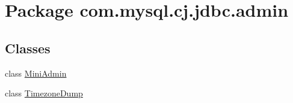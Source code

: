 \hypertarget{namespacecom_1_1mysql_1_1cj_1_1jdbc_1_1admin}{}\section{Package com.\+mysql.\+cj.\+jdbc.\+admin}
\label{namespacecom_1_1mysql_1_1cj_1_1jdbc_1_1admin}
\subsection*{Classes}
\begin{DoxyCompactItemize}
\item 
class \mbox{\hyperlink{classcom_1_1mysql_1_1cj_1_1jdbc_1_1admin_1_1_mini_admin}{Mini\+Admin}}
\item 
class \mbox{\hyperlink{classcom_1_1mysql_1_1cj_1_1jdbc_1_1admin_1_1_timezone_dump}{Timezone\+Dump}}
\end{DoxyCompactItemize}
